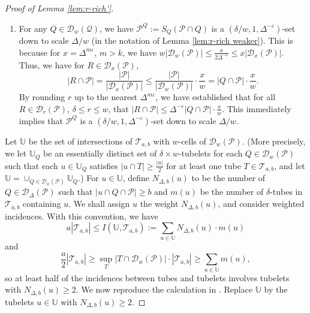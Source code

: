 \documentclass{amsart}
\newcommand{\T}{\mathcal{T}}
\newcommand{\U}{\mathbb{U}}
\newcommand{\eps}{\varepsilon}
\newcommand{\cD}{\mathcal{D}}
\newcommand{\cQ}{\mathcal{Q}}
\newcommand{\cP}{\mathcal{P}}
\begin{document}
\begin{proof}[Proof of Lemma \ref{lem:r-rich'}]
\begin{enumerate}[(C1)]
        \item\label{conc2} For any $Q \in \cD_w (\cQ)$, we have $\cP^Q := S_Q (\cP \cap Q)$ is a $(\delta/w, 1, \Delta^{-\eps})$-set down to scale $\Delta/w$ (in the notation of Lemma \ref{lem:r-rich weaker}). This is because for $x = \Delta^{m\eps}$, $m > k$, we have $w|\cD_w(\cP)| \le \frac{a}{2\Delta^{-\eps}} \le x|\cD_x(\cP)|$. Thus, we have for $R \in \cD_x (\cP)$,
        \begin{equation*}
            |R \cap \cP| = \frac{|\cP|}{|\cD_x (\cP)|} \le \frac{|\cP|}{|\cD_w (\cP)|} \cdot \frac{x}{w} = |Q \cap \cP| \cdot \frac{x}{w}.
        \end{equation*}
        By rounding $r$ up to the nearest $\Delta^{m\eps}$, we have established that for all $R \in \cD_r (\cP)$, $\delta \le r \le w$, that $|R \cap \cP| \le \Delta^{-\eps} |Q \cap \cP| \cdot \frac{x}{w}$. This immediately implies that $\cP^Q$ is a $(\delta/w, 1, \Delta^{-\eps})$-set down to scale $\Delta/w$.
    \end{enumerate}
    Let $\U$ be the set of intersections of $\T_{a,b}$ with $w$-cells of $\cD_w (\cP)$. (More precisely, we let $\U_Q$ be an essentially distinct set of $\delta \times w$-tubelets for each $Q \in \cD_w (\cP)$ such that each $u \in \U_Q$ satisfies $|u \cap T| \ge \frac{|u|}{2}$ for at least one tube $T \in \T_{a,b}$, and let $\U = \cup_{Q \in \cD_w (\cP)} \U_Q$.) For $u \in \U$, define $N_{\Delta, b} (u)$ to be the number of $Q \in \cD_\Delta (\cP)$ such that $|u \cap Q \cap \cP| \ge b$ and $m(u)$ be the number of $\delta$-tubes in $\T_{a,b}$ containing $u$. We shall assign $u$ the weight $N_{\Delta, b} (u)$, and consider weighted incidences. With this convention, we have
    \begin{equation*}
        a |\T_{a,b}| \le I(\U, \T_{a,b}) := \sum_{u \in \U} N_{\Delta, b} (u) \cdot m(u)
    \end{equation*}
    and
    \begin{equation*}
        \frac{a}{2} |\T_{a,b}| \ge \sup_T |T \cap \cD_w (\cP)| \cdot |\T_{a,b}| \ge \sum_{u \in \U} m(u),
    \end{equation*}
    so at least half of the incidences between tubes and tubelets involves tubelets with $N_{\Delta,b} (u) \ge 2$. We now reproduce the calculation in \cite[Theorem 5.1.2]{bradshaw2022additive}. Replace $\U$ by the tubelets $u \in \U$ with $N_{\Delta, b} (u) \ge 2$.


\end{proof}
\end{document}
